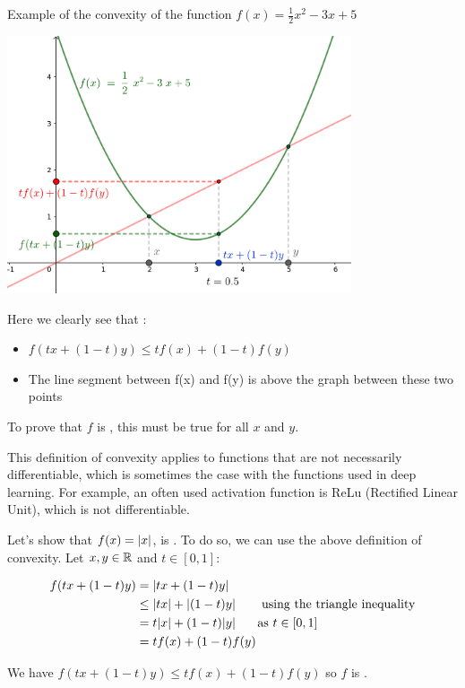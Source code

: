 \begin{example}
    Example of the convexity of the function $f(x) = \frac{1}{2}x^2 -3x+5$
    \begin{center}
      \includegraphics[width=4in]{images/Chapter4/convex1.png}
    \end{center}
    
    Here we clearly see that :
    \begin{itemize}
        \item $f(tx + (1-t)y) \leq tf(x) + (1-t)f(y)$
        \item The line segment between f(x) and f(y) is above the graph between these two points
    \end{itemize}
    
    To prove that $f$ is \cvx, this must be true for all $x$ and $y$.
\end{example}

This definition of convexity applies to functions that are not necessarily differentiable, which is sometimes the case with the functions used in deep learning. For example, an often used activation function is ReLu (Rectified Linear Unit), which is not differentiable.

\begin{example}
    Let's show that $f(x) = \abs{x}$, is \cvx. To do so, we can use the above definition of convexity. Let $x,y \in \R$ and $t \in [0,1]$:
    \begin{ceqn}
    \begin{align*}
    f(tx + (1-t)y) &= \abs{tx + (1-t)y} \\
    &\leq \abs{tx} + \abs{(1-t)y} \text{ \hspace{5mm} using the triangle inequality} \\
    &= t \abs{x} + (1-t)\abs{y} \text{\hspace{5mm} as $t \in [0,1]$} \\
    &= tf(x) + (1-t)f(y)
    \end{align*}
    \end{ceqn}
    We have $f(tx + (1-t)y) \leq tf(x) + (1-t)f(y) $ so $f$ is \cvx. 
\end{example}

